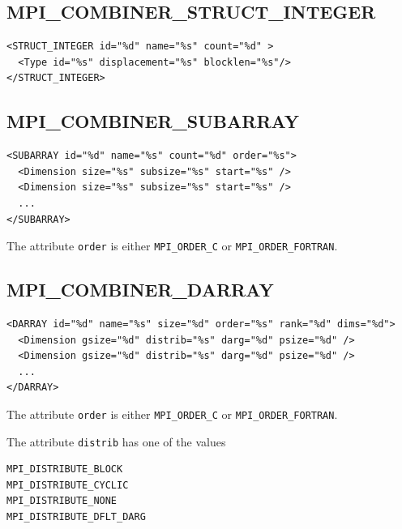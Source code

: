 \documentclass[a4paper,12pt,pdftex]{scrartcl}
\begin{document}
\subsection{MPI\_COMBINER\_STRUCT\_INTEGER}
\begin{lstlisting}
<STRUCT_INTEGER id="%d" name="%s" count="%d" >
  <Type id="%s" displacement="%s" blocklen="%s"/>
</STRUCT_INTEGER>
\end{lstlisting}

\subsection{MPI\_COMBINER\_SUBARRAY}
\begin{lstlisting}
<SUBARRAY id="%d" name="%s" count="%d" order="%s">
  <Dimension size="%s" subsize="%s" start="%s" />
  <Dimension size="%s" subsize="%s" start="%s" />
  ...
</SUBARRAY>
\end{lstlisting}
The attribute \lstinline{order} is either \lstinline{MPI_ORDER_C} or
\lstinline{MPI_ORDER_FORTRAN}. 

\subsection{MPI\_COMBINER\_DARRAY}
\begin{lstlisting}
<DARRAY id="%d" name="%s" size="%d" order="%s" rank="%d" dims="%d">
  <Dimension gsize="%d" distrib="%s" darg="%d" psize="%d" />
  <Dimension gsize="%d" distrib="%s" darg="%d" psize="%d" />
  ...
</DARRAY>
\end{lstlisting}
The attribute \lstinline{order} is either \lstinline{MPI_ORDER_C} or
\lstinline{MPI_ORDER_FORTRAN}.

The attribute \lstinline{distrib} has one of the values 
\begin{lstlisting}
MPI_DISTRIBUTE_BLOCK
MPI_DISTRIBUTE_CYCLIC
MPI_DISTRIBUTE_NONE
MPI_DISTRIBUTE_DFLT_DARG
\end{lstlisting}



\end{document}
